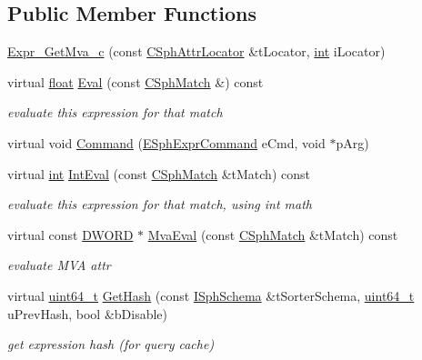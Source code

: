 \subsection*{Public Member Functions}
\begin{DoxyCompactItemize}
\item 
\hyperlink{structExpr__GetMva__c_affd55d9c6a64cea6accb41c10010d643}{Expr\-\_\-\-Get\-Mva\-\_\-c} (const \hyperlink{structCSphAttrLocator}{C\-Sph\-Attr\-Locator} \&t\-Locator, \hyperlink{sphinxexpr_8cpp_a4a26e8f9cb8b736e0c4cbf4d16de985e}{int} i\-Locator)
\item 
virtual \hyperlink{sphinxexpr_8cpp_a0e0d0739f7035f18f949c2db2c6759ec}{float} \hyperlink{structExpr__GetMva__c_afc934999e49a03229f6b92bca589acdb}{Eval} (const \hyperlink{classCSphMatch}{C\-Sph\-Match} \&) const 
\begin{DoxyCompactList}\small\item\em evaluate this expression for that match \end{DoxyCompactList}\item 
virtual void \hyperlink{structExpr__GetMva__c_af317d045fa2a18ebd065def6ea7b0ae3}{Command} (\hyperlink{sphinxexpr_8h_a30be184fb07bd80c271360fc6094c818}{E\-Sph\-Expr\-Command} e\-Cmd, void $\ast$p\-Arg)
\item 
virtual \hyperlink{sphinxexpr_8cpp_a4a26e8f9cb8b736e0c4cbf4d16de985e}{int} \hyperlink{structExpr__GetMva__c_aa94bf40b8057caa213b111079006b499}{Int\-Eval} (const \hyperlink{classCSphMatch}{C\-Sph\-Match} \&t\-Match) const 
\begin{DoxyCompactList}\small\item\em evaluate this expression for that match, using int math \end{DoxyCompactList}\item 
virtual const \hyperlink{sphinxstd_8h_a798af1e30bc65f319c1a246cecf59e39}{D\-W\-O\-R\-D} $\ast$ \hyperlink{structExpr__GetMva__c_a9a21f61432c4036e85d2cecc1dc87e38}{Mva\-Eval} (const \hyperlink{classCSphMatch}{C\-Sph\-Match} \&t\-Match) const 
\begin{DoxyCompactList}\small\item\em evaluate M\-V\-A attr \end{DoxyCompactList}\item 
virtual \hyperlink{sphinxstd_8h_aaa5d1cd013383c889537491c3cfd9aad}{uint64\-\_\-t} \hyperlink{structExpr__GetMva__c_a41d726b6f360ce3e3b909d2dc3ff11ef}{Get\-Hash} (const \hyperlink{classISphSchema}{I\-Sph\-Schema} \&t\-Sorter\-Schema, \hyperlink{sphinxstd_8h_aaa5d1cd013383c889537491c3cfd9aad}{uint64\-\_\-t} u\-Prev\-Hash, bool \&b\-Disable)
\begin{DoxyCompactList}\small\item\em get expression hash (for query cache) \end{DoxyCompactList}\end{DoxyCompactItemize}
